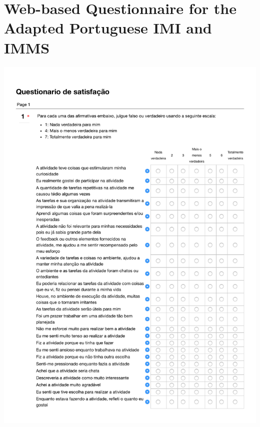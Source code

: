 \section[Web-based Questionnaire for the Adapted Portuguese IMI and IMMS]{Web-based Questionnaire for the Adapted Portuguese IMI and IMMS}
\label{annex:IMI-IMMS-third-study}
\includegraphics[width=1\textwidth]{images/annex/IMI-IMMS-third-study-01.pdf}
\newpage
